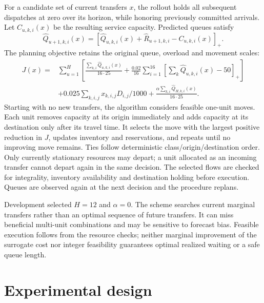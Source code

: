 For a candidate set of current transfers $x$, the rollout holds all subsequent dispatches at zero over its horizon, while honoring previously committed arrivals. Let $C_{u,k,i}(x)$ be the resulting service capacity. Predicted queues satisfy
\begin{equation}
\widehat Q_{u+1,k,i}(x)=
\left[\widehat Q_{u,k,i}(x)+\widehat R_{u+1,k,i}-C_{u,k,i}(x)\right]_+ .
\end{equation}
The planning objective retains the original queue, overload and movement scales:
\begin{equation}\label{eq:rollout_cost}
\begin{split}
J(x)={}&\sum_{u=1}^{H}\left[\frac{\sum_{k,i}\widehat Q_{u,k,i}(x)}{16\cdot25}
+\frac{0.02}{16}\sum_{i=1}^{16}\left[\sum_k\widehat Q_{u,k,i}(x)-50\right]_+\right]\\
&+0.025\sum_{k,i,j}x_{k,i,j}D_{i,j}/1000
+\frac{\alpha\sum_{k,i}\widehat Q_{H,k,i}(x)}{16\cdot25}.
\end{split}
\end{equation}
Starting with no new transfers, the algorithm considers feasible one-unit moves. Each unit removes capacity at its origin immediately and adds capacity at its destination only after its travel time. It selects the move with the largest positive reduction in $J$, updates inventory and reservations, and repeats until no improving move remains. Ties follow deterministic class/origin/destination order. Only currently stationary resources may depart; a unit allocated as an incoming transfer cannot depart again in the same decision. The selected flows are checked for integrality, inventory availability and destination holding before execution. Queues are observed again at the next decision and the procedure replans.

Development selected $H=12$ and $\alpha=0$. The scheme searches current marginal transfers rather than an optimal sequence of future transfers. It can miss beneficial multi-unit combinations and may be sensitive to forecast bias. Feasible execution follows from the resource checks; neither marginal improvement of the surrogate cost nor integer feasibility guarantees optimal realized waiting or a safe queue length.

\section{Experimental design}
